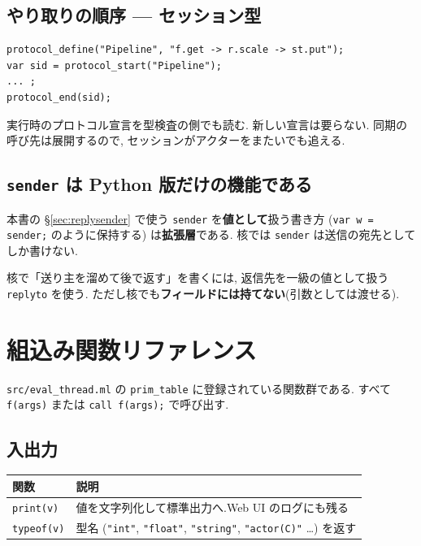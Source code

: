 \documentclass[11pt,a4paper]{article}
\begin{document}
\subsection{やり取りの順序 --- セッション型}

\begin{lstlisting}
protocol_define("Pipeline", "f.get -> r.scale -> st.put");
var sid = protocol_start("Pipeline");
... ;
protocol_end(sid);
\end{lstlisting}

実行時のプロトコル宣言を型検査の側でも読む. 新しい宣言は要らない.
同期の呼び先は展開するので, セッションがアクターをまたいでも追える.

\subsection{\texttt{sender} は Python 版だけの機能である}

本書の \S\ref{sec:replysender} で使う \texttt{sender} を\textbf{値として}扱う書き方
(\texttt{var w = sender;} のように保持する) は\textbf{拡張層}である.
核では \texttt{sender} は送信の宛先としてしか書けない.

核で「送り主を溜めて後で返す」を書くには,
返信先を一級の値として扱う \texttt{replyto} を使う.
ただし核でも\textbf{フィールドには持てない}(引数としては渡せる).

\section{組込み関数リファレンス}

\texttt{src/eval\_thread.ml} の \texttt{prim\_table} に登録されている関数群である.
すべて \texttt{f(args)} または \texttt{call f(args);} で呼び出す.

\subsection{入出力}

\begin{center}
\begin{tabular}{ll}
\toprule
関数 & 説明 \\
\midrule
\texttt{print(v)} & 値を文字列化して標準出力へ.Web UI のログにも残る \\
\texttt{typeof(v)} & 型名 (\texttt{"int"}, \texttt{"float"}, \texttt{"string"}, \texttt{"actor(C)"} \dots) を返す \\
\bottomrule
\end{tabular}
\end{center}
\end{document}
